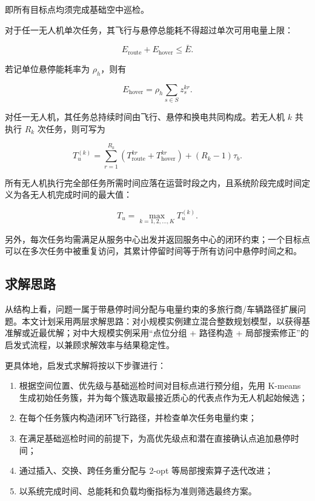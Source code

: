 \documentclass[12pt]{article}
\begin{document}
即所有目标点均须完成基础空中巡检。

对于任一无人机单次任务，其飞行与悬停总能耗不得超过单次可用电量上限：

\begin{equation}
E_{\text{route}} + E_{\text{hover}} \le \bar{E}.
\end{equation}

若记单位悬停能耗率为 $\rho_h$，则有

\begin{equation}
E_{\text{hover}} = \rho_h \sum_{s \in S} z_s^{kr}.
\end{equation}

对任一无人机，其任务总持续时间由飞行、悬停和换电共同构成。若无人机 $k$ 共执行 $R_k$ 次任务，则可写为

\begin{equation}
T_u^{(k)} = \sum_{r=1}^{R_k} \left(T_{\text{route}}^{kr} + T_{\text{hover}}^{kr}\right) + (R_k-1)\tau_b.
\end{equation}

所有无人机执行完全部任务所需时间应落在运营时段之内，且系统阶段完成时间定义为各无人机完成时间的最大值：

\begin{equation}
T_u = \max_{k=1,2,\dots,K} T_u^{(k)}.
\end{equation}

另外，每次任务均需满足从服务中心出发并返回服务中心的闭环约束；一个目标点可以在多次任务中被重复访问，其累计停留时间等于所有访问中悬停时间之和。

\subsection{求解思路}
从结构上看，问题一属于带悬停时间分配与电量约束的多旅行商/车辆路径扩展问题。本文计划采用两层求解思路：对小规模实例建立混合整数规划模型，以获得基准解或近最优解；对中大规模实例采用“点位分组 + 路径构造 + 局部搜索修正”的启发式流程，以兼顾求解效率与结果稳定性。

更具体地，启发式求解将按以下步骤进行：

\begin{enumerate}
	\item 根据空间位置、优先级与基础巡检时间对目标点进行预分组，先用 K-means 生成初始任务簇，并为每个簇选取最接近质心的代表点作为无人机起始候选；
	\item 在每个任务簇内构造闭环飞行路径，并检查单次任务电量约束；
	\item 在满足基础巡检时间的前提下，为高优先级点和潜在直接确认点追加悬停时间；
	\item 通过插入、交换、跨任务重分配与 2-opt 等局部搜索算子迭代改进；
	\item 以系统完成时间、总能耗和负载均衡指标为准则筛选最终方案。
\end{enumerate}
\end{document}
